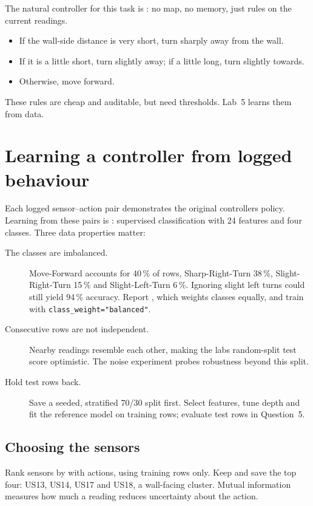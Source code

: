 The natural controller for this task is : no map, no memory, just rules on the current readings.

\begin{itemize}
  \item If the wall-side distance is very short, turn sharply away from the wall.
  \item If it is a little short, turn slightly away; if a little long, turn slightly towards.
  \item Otherwise, move forward.
\end{itemize}

These rules are cheap and auditable, but need thresholds. Lab~5 learns them from data.

\section{Learning a controller from logged behaviour}

Each logged sensor--action pair demonstrates the original controller\textquotesingle s policy. Learning from these pairs is : supervised classification with 24 features and four classes. Three data properties matter:

\begin{description}
  \item[The classes are imbalanced.] Move-Forward accounts for 40\,\% of rows, Sharp-Right-Turn 38\,\%, Slight-Right-Turn 15\,\% and Slight-Left-Turn 6\,\%. Ignoring slight left turns could still yield 94\,\% accuracy. Report , which weights classes equally, and train with \texttt{class\_weight="balanced"}.
  \item[Consecutive rows are not independent.] Nearby readings resemble each other, making the lab\textquotesingle s random-split test score optimistic. The noise experiment probes robustness beyond this split.
  \item[Hold test rows back.] Save a seeded, stratified 70/30 split first. Select features, tune depth and fit the reference model on training rows; evaluate test rows in Question~5.
\end{description}

\subsection{Choosing the sensors}

Rank sensors by  with actions, using training rows only. Keep and save the top four: US13, US14, US17 and US18, a wall-facing cluster. Mutual information measures how much a reading reduces uncertainty about the action.

